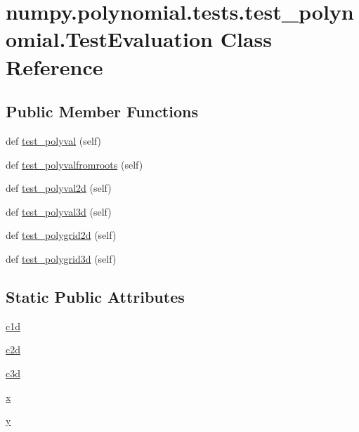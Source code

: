 \hypertarget{classnumpy_1_1polynomial_1_1tests_1_1test__polynomial_1_1TestEvaluation}{}\section{numpy.\+polynomial.\+tests.\+test\+\_\+polynomial.\+Test\+Evaluation Class Reference}
\label{classnumpy_1_1polynomial_1_1tests_1_1test__polynomial_1_1TestEvaluation}
\subsection*{Public Member Functions}
\begin{DoxyCompactItemize}
\item 
def \hyperlink{classnumpy_1_1polynomial_1_1tests_1_1test__polynomial_1_1TestEvaluation_ac979093b285fefa3f1b790265d440a60}{test\+\_\+polyval} (self)
\item 
def \hyperlink{classnumpy_1_1polynomial_1_1tests_1_1test__polynomial_1_1TestEvaluation_a45fb4341b7b1a6f3218c4d34b688b4db}{test\+\_\+polyvalfromroots} (self)
\item 
def \hyperlink{classnumpy_1_1polynomial_1_1tests_1_1test__polynomial_1_1TestEvaluation_af7a631d7b840848d0b25e7103ab2c44d}{test\+\_\+polyval2d} (self)
\item 
def \hyperlink{classnumpy_1_1polynomial_1_1tests_1_1test__polynomial_1_1TestEvaluation_ac5e8dcab42a409316b11d5c4c5695248}{test\+\_\+polyval3d} (self)
\item 
def \hyperlink{classnumpy_1_1polynomial_1_1tests_1_1test__polynomial_1_1TestEvaluation_a1e228e07c2341f4f620c46963c32945c}{test\+\_\+polygrid2d} (self)
\item 
def \hyperlink{classnumpy_1_1polynomial_1_1tests_1_1test__polynomial_1_1TestEvaluation_aeb71db89065cf746948c5500a274d2a0}{test\+\_\+polygrid3d} (self)
\end{DoxyCompactItemize}
\subsection*{Static Public Attributes}
\begin{DoxyCompactItemize}
\item 
\hyperlink{classnumpy_1_1polynomial_1_1tests_1_1test__polynomial_1_1TestEvaluation_a95a8f0551eb3d8ba513fc7717b68d71a}{c1d}
\item 
\hyperlink{classnumpy_1_1polynomial_1_1tests_1_1test__polynomial_1_1TestEvaluation_a7ffe5421ece9cea9beaf8e9c0dba58b3}{c2d}
\item 
\hyperlink{classnumpy_1_1polynomial_1_1tests_1_1test__polynomial_1_1TestEvaluation_a2a4ad6f0366dcc3f840f08239e7709b8}{c3d}
\item 
\hyperlink{classnumpy_1_1polynomial_1_1tests_1_1test__polynomial_1_1TestEvaluation_a27a2ea332f8a93c11c58535d1b69a51c}{x}
\item 
\hyperlink{classnumpy_1_1polynomial_1_1tests_1_1test__polynomial_1_1TestEvaluation_a8169409047fd07dce7588fe2c25d59bf}{y}
\end{DoxyCompactItemize}


